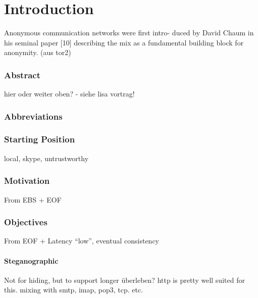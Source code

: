 \chapter{Introduction}

Anonymous communication networks were first intro-
duced by David Chaum in his seminal paper [10] describing
the mix as a fundamental building block for anonymity.
(aus tor2)

\subsection{Abstract}
hier oder weiter oben? - siehe lisa vortrag!

\subsection{Abbreviations}
\subsection{Starting Position}
local, skype, untrustworthy

\subsection{Motivation}
From EBS + EOF

\subsection{Objectives}
From EOF + Latency "`low"', eventual consistency
\subsubsection{Steganographic}
Not for hiding, but to support longer überleben?
http is pretty well suited for this.
mixing with smtp, imap, pop3, tcp. etc.



